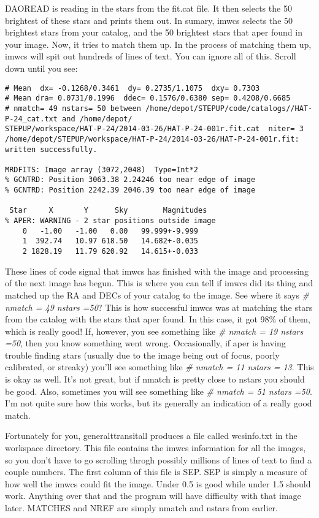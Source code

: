 \documentclass[10pt,preprint]{aastex}
\begin{document}
DAOREAD is reading in the stars from the fit.cat file. It then selects the 50 brightest of these stars and prints them out. In sumary, imwcs selects the 50 brightest stars from your catalog, and the 50 brightest stars that aper found in your image. Now, it tries to match them up. In the process of matching them up,  imwcs will spit out hundreds of lines of text. You can ignore all of this. Scroll down until you see:

\begin{verbatim}
# Mean  dx= -0.1268/0.3461  dy= 0.2735/1.1075  dxy= 0.7303
# Mean dra= 0.0731/0.1996  ddec= 0.1576/0.6380 sep= 0.4208/0.6685
# nmatch= 49 nstars= 50 between /home/depot/STEPUP/code/catalogs//HAT-P-24_cat.txt and /home/depot/
STEPUP/workspace/HAT-P-24/2014-03-26/HAT-P-24-001r.fit.cat  niter= 3
/home/depot/STEPUP/workspace/HAT-P-24/2014-03-26/HAT-P-24-001r.fit: written successfully.

MRDFITS: Image array (3072,2048)  Type=Int*2
% GCNTRD: Position 3063.38 2.24246 too near edge of image
% GCNTRD: Position 2242.39 2046.39 too near edge of image

 Star     X       Y      Sky        Magnitudes
% APER: WARNING - 2 star positions outside image
    0   -1.00   -1.00   0.00   99.999+-9.999
    1  392.74   10.97 618.50   14.682+-0.035
    2 1828.19   11.79 620.92   14.615+-0.033
\end{verbatim}

These lines of code signal that imwcs has finished with the image and processing of the next image has begun. This is where you can tell if imwcs did its thing and matched up the RA and DECs of your catalog to the image. See where it says \emph{\# nmatch = 49 nstars =50}? This is how successful imwcs was at matching the stars from the catalog with the stars that aper found. In this case, it got 98\% of them, which is really good! If, however, you see something like \emph{\# nmatch = 19 nstars =50}, then you know something went wrong. Occasionally, if aper is having trouble finding stars (usually due to the image being out of focus, poorly calibrated, or streaky) you'll see something like \emph{\# nmatch = 11 nstars = 13}. This is okay as well. It's not great, but if nmatch is pretty close to nstars you should be good. Also, sometimes you will see something like \emph{\# nmatch = 51 nstars =50}. I'm not quite sure how this works, but its generally an indication of a really good match. 

	Fortunately for you, generalttransitall produces a file called wcsinfo.txt in the workspace directory. This file contains the imwcs information for all the images, so you don't have to go scrolling throgh possibly millions of lines of text to find a couple numbers. The first column of this file is SEP. SEP is simply a measure of how well the imwcs could fit the image. Under 0.5 is good while under 1.5 should work. Anything over that and the program will have difficulty with that image later. MATCHES and NREF are simply nmatch and nstars from earlier.
\end{document}
